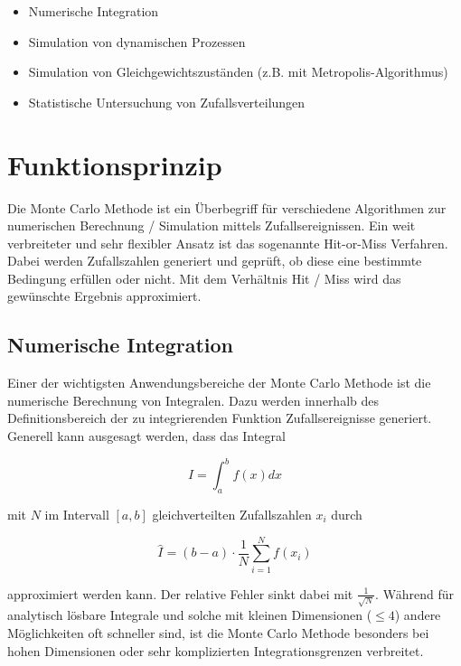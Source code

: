 \documentclass{book}
\begin{document}
\begin{refsection}
\begin{itemize}
	\item Numerische Integration
	\item Simulation von dynamischen Prozessen
	\item Simulation von Gleichgewichtszuständen (z.B. mit Metropolis-Algorithmus)
	\item Statistische Untersuchung von Zufallsverteilungen
\end{itemize}

\section{Funktionsprinzip}
Die Monte Carlo Methode ist ein Überbegriff für verschiedene Algorithmen zur numerischen Berechnung / Simulation mittels Zufallsereignissen. Ein weit verbreiteter und sehr flexibler Ansatz ist das sogenannte Hit-or-Miss Verfahren. Dabei werden Zufallszahlen generiert und geprüft, ob diese eine bestimmte Bedingung erfüllen oder nicht. Mit dem Verhältnis Hit / Miss wird das gewünschte Ergebnis approximiert. 

\subsection{Numerische Integration} \label{subsec:numIntegration}
Einer der wichtigsten Anwendungsbereiche der Monte Carlo Methode ist die numerische Berechnung von Integralen. Dazu werden innerhalb des Definitionsbereich der zu integrierenden Funktion Zufallsereignisse generiert. Generell kann ausgesagt werden, dass das Integral

\begin{equation}
	I = \int_a^b f(x) dx
\end{equation} 

mit $N$ im Intervall $[a,b]$ gleichverteilten Zufallszahlen $x_i$ durch

\begin{equation}
	\hat{I} = (b-a) \cdot \frac{1}{N} \sum_{i=1}^{N} f(x_i)
\end{equation}

approximiert werden kann. Der relative Fehler sinkt dabei mit $\frac{1}{\sqrt{N}}$. Während für analytisch lösbare Integrale und solche mit kleinen Dimensionen ($\leq 4$) andere Möglichkeiten oft schneller sind, ist die Monte Carlo Methode besonders bei hohen Dimensionen oder sehr komplizierten Integrationsgrenzen verbreitet. \\


\end{refsection}
\end{document}
